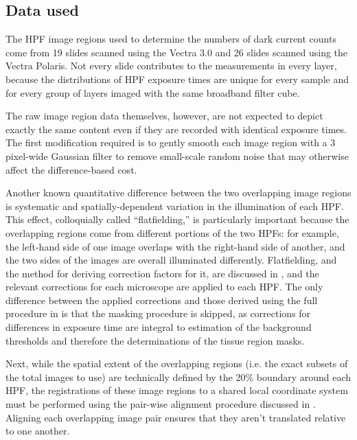 \documentclass[letterpaper,11pt]{article}
\begin{document}
\subsection{Data used}
\label{ssec:data_used}

The HPF image regions used to determine the numbers of dark current counts come from 19 slides scanned using the Vectra 3.0 and 26 slides scanned using the Vectra Polaris. Not every slide contributes to the measurements in every layer, because the distributions of HPF exposure times are unique for every sample and for every group of layers imaged with the same broadband filter cube. 

The raw image region data themselves, however, are not expected to depict exactly the same content even if they are recorded with identical exposure times. The first modification required is to gently smooth each image region with a 3 pixel-wide Gaussian filter to remove small-scale random noise that may otherwise affect the difference-based cost. 


Another known quantitative difference between the two overlapping image regions is systematic and spatially-dependent variation in the illumination of each HPF. This effect, colloquially called ``flatfielding,'' is particularly important because the overlapping regions come from different portions of the two HPFs: for example, the left-hand side of one image overlaps with the right-hand side of another, and the two sides of the images are overall illuminated differently. Flatfielding, and the method for deriving correction factors for it, are discussed in \cite{flatfielding_note}, and the relevant corrections for each microscope are applied to each HPF. The only difference between the applied corrections and those derived using the full procedure in \cite{flatfielding_note} is that the masking procedure is skipped, as corrections for differences in exposure time are integral to estimation of the background thresholds and therefore the determinations of the tissue region masks.


Next, while the spatial extent of the overlapping regions (i.e. the exact subsets of the total images to use) are technically defined by the 20\% boundary around each HPF, the registrations of these image regions to a shared local coordinate system must be performed using the pair-wise alignment procedure discussed in \cite{Heshy}. Aligning each overlapping image pair ensures that they aren't translated relative to one another.
\end{document}
